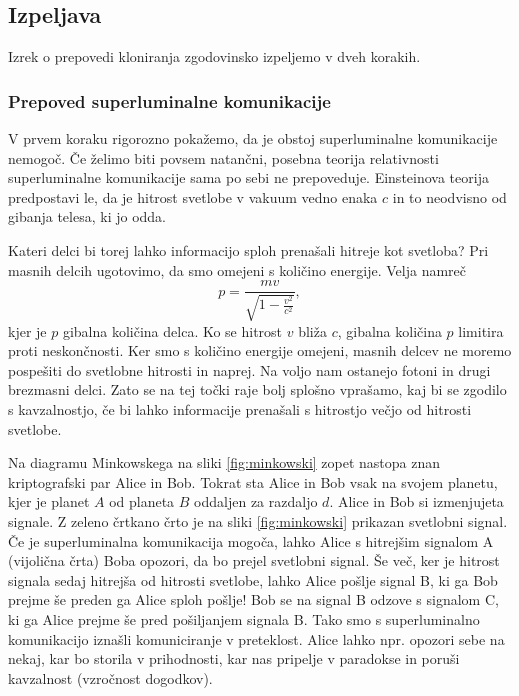 \documentclass[12pt]{article}
\begin{document}
 \subsection{Izpeljava}
Izrek o prepovedi kloniranja zgodovinsko izpeljemo v dveh korakih. 
\subsubsection{Prepoved superluminalne komunikacije}
V prvem koraku rigorozno pokažemo, da je obstoj superluminalne komunikacije nemogoč. Če želimo biti povsem natančni, posebna teorija relativnosti superluminalne komunikacije sama po sebi ne prepoveduje. Einsteinova teorija predpostavi le, da je hitrost svetlobe v vakuum vedno enaka $c$ in to neodvisno od gibanja telesa, ki jo odda. \par Kateri delci bi torej lahko informacijo sploh prenašali hitreje kot svetloba? Pri masnih delcih ugotovimo, da smo omejeni s količino energije. Velja namreč
\begin{equation}
p = \frac{mv}{\sqrt{1-\frac{v^2}{c^2}}},
\end{equation}
kjer je $p$ gibalna količina delca. Ko se hitrost $v$ bliža $c$, gibalna količina $p$ limitira proti neskončnosti. Ker smo s količino energije omejeni, masnih delcev ne moremo pospešiti do svetlobne hitrosti in naprej. Na voljo nam ostanejo fotoni in drugi brezmasni delci. Zato se na tej točki raje bolj splošno vprašamo, kaj bi se zgodilo s kavzalnostjo, če bi lahko informacije prenašali s hitrostjo večjo od hitrosti svetlobe. \cite{marcocerezoEntangledParticlesFaster2015}
\par
Na diagramu Minkowskega na sliki \ref{fig:minkowski} zopet nastopa znan kriptografski par Alice in Bob. Tokrat sta Alice in Bob vsak na svojem planetu, kjer je planet $A$ od planeta $B$ oddaljen za razdaljo $d$. Alice in Bob si izmenjujeta signale. Z zeleno črtkano črto je na sliki \ref{fig:minkowski} prikazan svetlobni signal. Če je superluminalna komunikacija mogoča, lahko Alice s hitrejšim signalom A (vijolična črta) Boba opozori, da bo prejel svetlobni signal. Še več, ker je hitrost signala sedaj hitrejša od hitrosti svetlobe, lahko Alice pošlje signal B, ki ga Bob prejme še preden ga Alice sploh pošlje! Bob se na signal B odzove s signalom C, ki ga Alice prejme še pred pošiljanjem signala B. Tako smo s superluminalno komunikacijo iznašli komuniciranje v preteklost. Alice lahko npr. opozori sebe na nekaj, kar bo storila v prihodnosti, kar nas pripelje v paradokse in poruši kavzalnost (vzročnost dogodkov). \cite{marcocerezoEntangledParticlesFaster2015}
\end{document}
